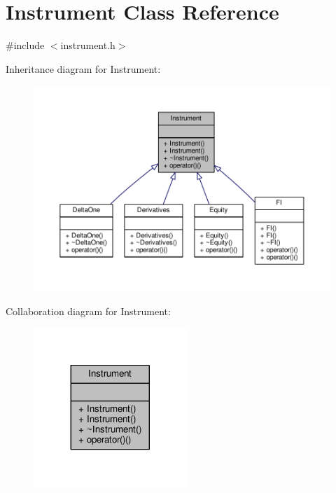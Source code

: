 \hypertarget{classInstrument}{}\section{Instrument Class Reference}
\label{classInstrument}


{\ttfamily \#include $<$instrument.\+h$>$}



Inheritance diagram for Instrument\+:
\nopagebreak
\begin{figure}[H]
\begin{center}
\leavevmode
\includegraphics[width=350pt]{classInstrument__inherit__graph}
\end{center}
\end{figure}


Collaboration diagram for Instrument\+:
\nopagebreak
\begin{figure}[H]
\begin{center}
\leavevmode
\includegraphics[width=164pt]{classInstrument__coll__graph}
\end{center}
\end{figure}
